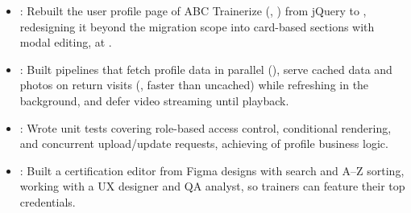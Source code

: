 \begin{itemize}
  \item {}: Rebuilt the user profile page of ABC Trainerize (, ) from jQuery to , redesigning it beyond the migration scope into card-based sections with modal editing, at .
  \item {}: Built  pipelines that fetch profile data in parallel (), serve cached data and photos on return visits (, \resumeEmphasis{2.4\ensuremath{\times}} faster than uncached) while refreshing in the background, and defer video streaming until playback.
  \item {}: Wrote  unit tests covering role-based access control, conditional rendering, and concurrent upload/update requests, achieving  of profile business logic.
  \item {}: Built a  certification editor from Figma designs with search and A--Z sorting, working with a UX designer and QA analyst, so trainers can feature their top credentials.
\end{itemize}
